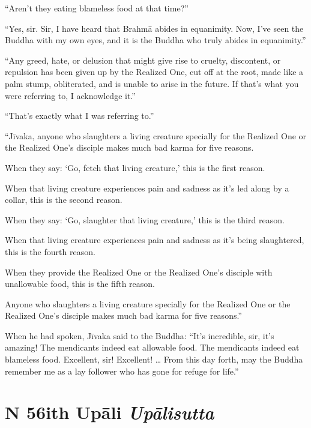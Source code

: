 \documentclass[12pt,openany]{book}%
\newcommand*{\suttatitleacronym}[1]{\smaller[2]{#1}\vspace*{.3em}}
\newcommand*{\suttatitletranslation}[1]{\linebreak{#1}}
\newcommand*{\suttatitleroot}[1]{\linebreak\smaller[2]\itshape{#1}}
\newcommand*{\tocacronym}[1]{\hspace*{-3.3em}{#1}\quad}
\newcommand*{\toctranslation}[1]{#1}
\newcommand*{\tocroot}[1]{(\textit{#1})}
\begin{document}
“Aren’t they eating blameless food at that time?” 

“Yes, sir. Sir, I have heard that \textsanskrit{Brahmā} abides in equanimity. Now, I’ve seen the Buddha with my own eyes, and it is the Buddha who truly abides in equanimity.” 

“Any greed, hate, or delusion that might give rise to cruelty, discontent, or repulsion has been given up by the Realized One, cut off at the root, made like a palm stump, obliterated, and is unable to arise in the future. If that’s what you were referring to, I acknowledge it.” 

“That’s exactly what I was referring to.” 

“\textsanskrit{Jīvaka}, anyone who slaughters a living creature specially for the Realized One or the Realized One’s disciple makes much bad karma for five reasons. 

When they say: ‘Go, fetch that living creature,’ this is the first reason. 

When that living creature experiences pain and sadness as it’s led along by a collar, this is the second reason. 

When they say: ‘Go, slaughter that living creature,’ this is the third reason. 

When that living creature experiences pain and sadness as it’s being slaughtered, this is the fourth reason. 

When they provide the Realized One or the Realized One’s disciple with unallowable food, this is the fifth reason. 

Anyone who slaughters a living creature specially for the Realized One or the Realized One’s disciple makes much bad karma for five reasons.” 

When he had spoken, \textsanskrit{Jīvaka} said to the Buddha: “It’s incredible, sir, it’s amazing! The mendicants indeed eat allowable food. The mendicants indeed eat blameless food. Excellent, sir! Excellent! … From this day forth, may the Buddha remember me as a lay follower who has gone for refuge for life.” 

%
\section*{{\suttatitleacronym MN 56}{\suttatitletranslation With Upāli }{\suttatitleroot Upālisutta}}
\addcontentsline{toc}{section}{\tocacronym{MN 56} \toctranslation{With Upāli } \tocroot{Upālisutta}}
\end{document}
